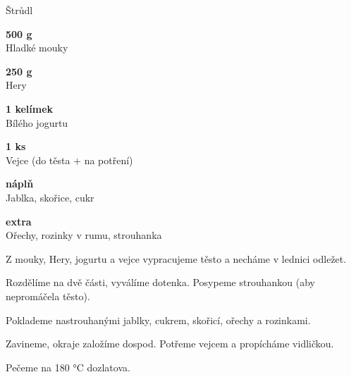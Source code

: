 \documentclass[11pt,a4paper]{article}
\begin{document}
\begin{recipe}[Goldenrod]{Štrůdl}
    \begin{ingredients}
        \item \parbox[t]{\linewidth}{\raggedright \weight \textbf{500 g}\\ Hladké mouky}
        \item \parbox[t]{\linewidth}{\raggedright \weight \textbf{250 g}\\ Hery}
        \item \parbox[t]{\linewidth}{\raggedright \piece \textbf{1 kelímek}\\ Bílého jogurtu}
        \item \parbox[t]{\linewidth}{\raggedright \piece \textbf{1 ks}\\ Vejce (do těsta + na potření)}
        \item \parbox[t]{\linewidth}{\raggedright \indefinite \textbf{náplň}\\ Jablka, skořice, cukr}
        \item \parbox[t]{\linewidth}{\raggedright \indefinite \textbf{extra}\\ Ořechy, rozinky v rumu, strouhanka}
    \end{ingredients}
    \begin{steps}
        \item Z mouky, Hery, jogurtu a vejce vypracujeme těsto a necháme v lednici odležet.
        \item Rozdělíme na dvě části, vyválíme dotenka. Posypeme strouhankou (aby nepromáčela těsto).
        \item Poklademe nastrouhanými jablky, cukrem, skořicí, ořechy a rozinkami.
        \item Zavineme, okraje založíme dospod. Potřeme vejcem a propícháme vidličkou.
        \item Pečeme na 180 °C dozlatova.
    \end{steps}
\end{recipe}
\end{document}
